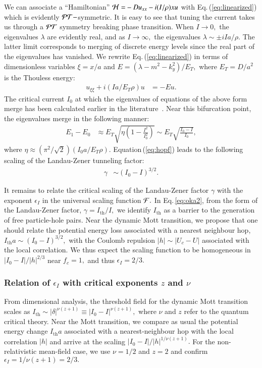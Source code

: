 \documentclass[aps,twocolumn,prl,10pt,amsmath,amssymb,nofootinbib,showpacs,superscriptaddress,floatfix]{revtex4-1}
\begin{document}
We can associate a ``Hamiltonian'' ${\cal H=}-Du_{xx}-i(I/\rho)xu$
with Eq.\,(\ref{eq:linearized}) which is evidently ${\cal PT}-$symmetric.
It is easy to see that tuning the current takes us through a ${\cal PT}$ symmetry
breaking phase transition. When $I\rightarrow0,$ the eigenvalues
$\lambda$ are evidently real, and as $I\rightarrow\infty,$ the eigenvalues
$\lambda\sim\pm iIa/\rho.$ The latter limit corresponds to merging
of discrete energy levels since the real part of the eigenvalues has
vanished. We rewrite Eq.\,(\ref{eq:linearized}) in terms of dimensionless
variables $\xi=x/a$ and $E=(\lambda-m^{2}-k_{y}^{2})/E_{T},$ where
$E_{T}=D/a^{2}$ is the Thouless energy:
\begin{align}
	u_{\xi\xi}+i(Ia/E_{T}\rho)u & =-Eu.\label{eq:linearized2}
\end{align}
The critical current $I_{0}$ at which the eigenvalues of equations
of the above form merge has been calculated earlier in the literature~\cite{rubinstein,vinokur}.
Near this bifurcation point, the eigenvalues merge in the following
manner:
\begin{align}
	E_{1}-E_{0} & \approx E_{T}\sqrt{\eta\left(1-\frac{I^{2}}{I_{0}^{2}}\right)}\sim E_{T}\sqrt{\frac{I_{0}-I}{I_{0}}},\label{eq:hopf}
\end{align}
where $\eta\approx(\pi^{2}/\sqrt{2})(I_{0}a/E_{T}\rho)$.  Equation\,(\ref{eq:hopf})
leads to the following scaling of the Landau-Zener tunneling factor:
\begin{align}
	\gamma & \sim(I_{0}-I)^{3/2}.\label{eq:LZ-vortex}
\end{align}


It remains to relate the critical scaling of the Landau-Zener factor
$\gamma$ with the exponent $\epsilon_I$ in the universal scaling
function ${\cal F}.$ In Eq.\,\eqref{eq:oka2}, from the form of the
Landau-Zener factor, $\gamma=I_{\text{th}}/I,$ we identify $I_{\text{th}}$
as a barrier to the generation of free particle-hole pairs. Near the
dynamic Mott transition, we propose that one should relate the potential
energy loss associated with a nearest neighbour hop, $I_{\text{th}}a\sim(I_{0}-I)^{3/2},$
with the Coulomb repulsion $|h|\sim|U_{c}-U|$ associated with the
local correlation. We thus expect the scaling function to be homogeneous
in $|I_{0}-I|/|h|^{2/3}$ near $f_{c}=1,$ and thus $\epsilon_I=2/3.$


\subsubsection{Relation of $\epsilon_I$ with critical exponents $z$ and $\nu$}
From dimensional analysis,
the threshold field for the dynamic Mott transition scales as $I_{\text{th}}\sim|\delta|^{\nu(z+1)}\equiv|I_{0}-I|^{\nu(z+1)},$
where $\nu$ and $z$ refer to the quantum critical theory. Near the
Mott transition, we compare as usual the potential energy change $I_{\text{th}}a$
associated with a nearest-neighbour hop with the local correlation
$|h|$ and arrive at the scaling $|I_{0}-I|/|h|^{1/\nu(z+1)}.$ For
the non-relativistic mean-field case, we use $\nu=1/2$ and $z=2$
and confirm $\epsilon_I=1/\nu(z+1)=2/3.$ 
\end{document}
